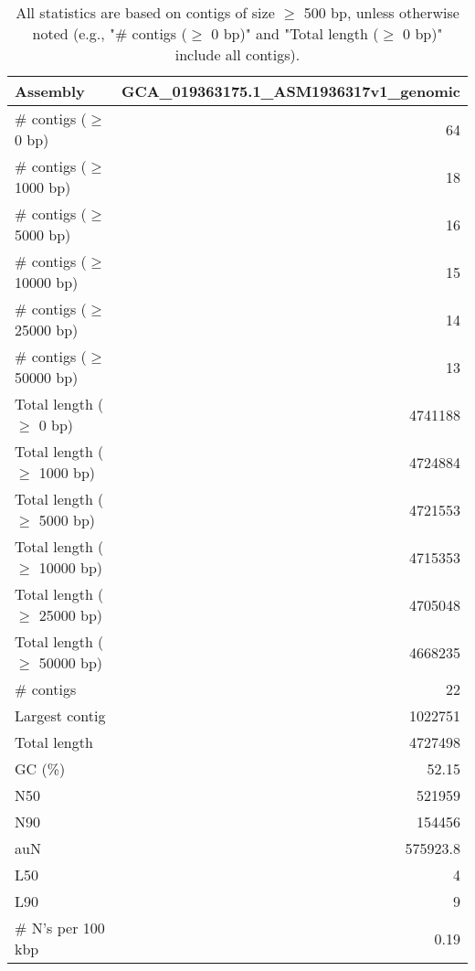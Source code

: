 \documentclass[12pt,a4paper]{article}
\begin{document}
\begin{table}[ht]
\begin{center}
\caption{All statistics are based on contigs of size $\geq$ 500 bp, unless otherwise noted (e.g., "\# contigs ($\geq$ 0 bp)" and "Total length ($\geq$ 0 bp)" include all contigs).}
\begin{tabular}{|l*{1}{|r}|}
\hline
Assembly & GCA\_019363175.1\_ASM1936317v1\_genomic \\ \hline
\# contigs ($\geq$ 0 bp) & 64 \\ \hline
\# contigs ($\geq$ 1000 bp) & 18 \\ \hline
\# contigs ($\geq$ 5000 bp) & 16 \\ \hline
\# contigs ($\geq$ 10000 bp) & 15 \\ \hline
\# contigs ($\geq$ 25000 bp) & 14 \\ \hline
\# contigs ($\geq$ 50000 bp) & 13 \\ \hline
Total length ($\geq$ 0 bp) & 4741188 \\ \hline
Total length ($\geq$ 1000 bp) & 4724884 \\ \hline
Total length ($\geq$ 5000 bp) & 4721553 \\ \hline
Total length ($\geq$ 10000 bp) & 4715353 \\ \hline
Total length ($\geq$ 25000 bp) & 4705048 \\ \hline
Total length ($\geq$ 50000 bp) & 4668235 \\ \hline
\# contigs & 22 \\ \hline
Largest contig & 1022751 \\ \hline
Total length & 4727498 \\ \hline
GC (\%) & 52.15 \\ \hline
N50 & 521959 \\ \hline
N90 & 154456 \\ \hline
auN & 575923.8 \\ \hline
L50 & 4 \\ \hline
L90 & 9 \\ \hline
\# N's per 100 kbp & 0.19 \\ \hline
\end{tabular}
\end{center}
\end{table}
\end{document}
